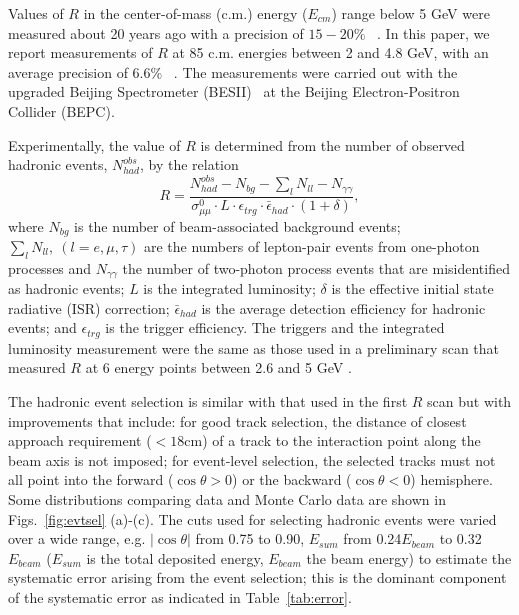 Values of $R$ in the center-of-mass (c.m.) energy ($E_{cm}$) range below 5 GeV  
were measured about 20 years ago with a precision of $15 - 20\%$
~\cite{mark1,gamma2,pluto}. 
In this paper, we report measurements 
of $R$ at 85 c.m. energies between 2 and 4.8 GeV, with an average precision
of $6.6\%$ ~\cite{rscan2}.  
The measurements were carried out with the upgraded Beijing Spectrometer
(BESII)~\cite{bes2} at the Beijing Electron-Positron Collider (BEPC). 

Experimentally, the value of $R$ is determined from the number of 
observed hadronic events, $N^{obs}_{had}$, by the relation
\begin{equation}
R=\frac{ N^{obs}_{had} - N_{bg} - \sum_{l}N_{ll} - N_{\gamma\gamma} }
{ \sigma^0_{\mu\mu} \cdot L \cdot \epsilon_{trg} \cdot \bar \epsilon_{had}
\cdot (1+\delta)},
\end{equation}
where $N_{bg}$ is the number of beam-associated background events;
$\sum_{l}N_{ll},~(l=e,\mu,\tau)$ are the numbers
of lepton-pair events from one-photon processes and $N_{\gamma\gamma}$
the number of two-photon process
events that are misidentified as hadronic events;
$L$ is the integrated luminosity; $\delta$ is
the effective initial state radiative (ISR) correction; 
$\bar\epsilon_{had}$ is the average detection efficiency 
for hadronic events; and $\epsilon_{trg}$ is the trigger efficiency. 
The triggers and the integrated luminosity measurement
 were the same as those used in
a preliminary scan that measured $R$ at 6 energy points
between 2.6 and 5 GeV \cite{besr_1}.

The hadronic event selection is similar with that used in the first $R$
scan \cite{besr_1} but with improvements that include: for good 
track selection, the distance of closest approach requirement ($<18$cm) 
of a track to the interaction point along the beam axis is not imposed;
for event-level selection, the selected tracks must not all point into the 
forward ($\cos \theta > 0$) or the backward ($\cos \theta < 0$) hemisphere.
Some distributions comparing data and Monte Carlo data
are shown in Figs.~\ref{fig:evtsel} (a)-(c).
The cuts used for selecting hadronic events were varied over a 
wide range, e.g. $|\cos \theta|$ from 0.75 to 0.90, 
$E_{sum}$ from 0.24$E_{beam}$ to 0.32$E_{beam}$ ($E_{sum}$ is the total
deposited energy, $E_{beam}$ the beam energy) to estimate the 
systematic error arising from the event selection; this is the dominant 
component of the systematic error as indicated in Table~\ref{tab:error}.  

